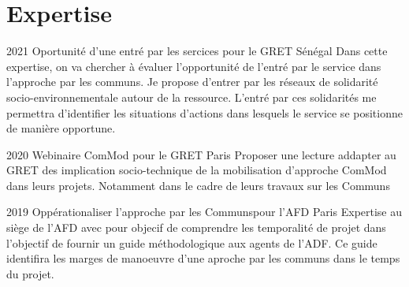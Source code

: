 \documentclass[]{cv-etienne}
\begin{document}
\section{Expertise}
\begin{entrylist}
  \entry
  {2021}
  {Oportunité d'une entré par les sercices {\normalfont pour le GRET}}
  {Sénégal}
  {Dans cette expertise, on va chercher à évaluer l'opportunité de l'entré par le service dans l'approche par les communs. Je propose d'entrer par les réseaux de solidarité socio-environnementale autour de la ressource. L'entré par ces solidarités me permettra d'identifier les situations d'actions dans lesquels le service se positionne de manière opportune. }
\end{entrylist}
\begin{entrylist}
  \entry
  {2020}
  {Webinaire ComMod {\normalfont pour le GRET}}
  {Paris}
  {Proposer une lecture addapter au GRET des implication socio-technique de la mobilisation d'approche ComMod dans leurs projets. Notamment dans le cadre de leurs travaux sur les Communs}
\end{entrylist}
\begin{entrylist}
  \entry
  {2019}
  {Oppérationaliser l'approche par les Communs{\normalfont pour l'AFD}}
  {Paris}
  {Expertise au siège de l'AFD avec pour objecif de comprendre les temporalité de projet dans l'objectif de fournir un guide méthodologique aux agents de l'ADF. Ce guide identifira les marges de manoeuvre d'une aproche par les communs dans le temps du projet.}
\end{entrylist}
\end{document}
